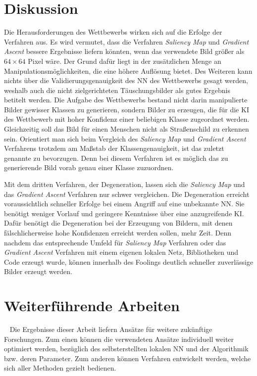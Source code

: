 \section{Diskussion}
Die Herausforderungen des Wettbewerbs wirken sich auf die Erfolge der Verfahren aus.
Es wird vermutet, dass die Verfahren \textit{Saliency Map} und \textit{Gradient Ascent} bessere Ergebnisse liefern könnten, wenn das verwendete Bild größer als $64\times64$ Pixel wäre. Der Grund dafür liegt in der zusätzlichen Menge an Manipulationsmöglichkeiten, die eine höhere Auflösung bietet. Des Weiteren kann nichts über die Validierungsgenauigkeit des \ac{NN} des Wettbewerbs gesagt werden, weshalb auch die nicht zielgerichteten Täuschungsbilder als gutes Ergebnis betitelt werden. Die Aufgabe des Wettbewerbs bestand nicht darin manipulierte Bilder gewisser Klassen zu generieren, sondern Bilder zu erzeugen, die für die \ac{KI} des Wettbewerb mit hoher Konfidenz einer beliebigen Klasse zugeordnet werden. Gleichzeitig soll das Bild für einen Menschen nicht als Straßenschild zu erkennen sein.
Orientiert man sich beim Vergleich des \textit{Saliency Map} und \textit{Gradient Ascent} Verfahrens trotzdem am Maßstab der Klassengenauigkeit, ist das zuletzt genannte zu bevorzugen. Denn bei diesem Verfahren ist es möglich das zu generierende Bild vorab genau einer Klasse zuzuordnen. 

Mit dem dritten Verfahren, der Degeneration, lassen sich die \textit{Saliency Map} und das \textit{Gradient Ascent} Verfahren nur schwer vergleichen.
Die Degeneration erreicht voraussichtlich schneller Erfolge bei einem Angriff auf eine unbekannte \ac{NN}. Sie benötigt weniger Vorlauf und geringere Kenntnisse über eine anzugreifende \ac{KI}. Dafür benötigt die Degeneration bei der Erzeugung von Bildern, mit denen fälschlicherweise hohe Konfidenzen erreicht werden sollen, mehr Zeit.
Denn nachdem das entsprechende Umfeld für \textit{Saliency Map} Verfahren oder das \textit{Gradient Ascent} Verfahren mit einem eigenen lokalen Netz, Bibliotheken und Code erzeugt wurde, können innerhalb des Foolings deutlich schneller zuverlässige Bilder erzeugt werden.  

\section{Weiterführende Arbeiten}~\newline 
Die Ergebnisse dieser Arbeit liefern Ansätze für weitere zukünftige Forschungen. Zum einen können die verwendeten Ansätze individuell weiter optimiert werden, bezüglich des selbsterstellten lokalen \acl{NN} und der Algorithmik bzw. deren Parameter. Zum anderen können Verfahren entwickelt werden, welche sich aller Methoden gezielt bedienen. 


